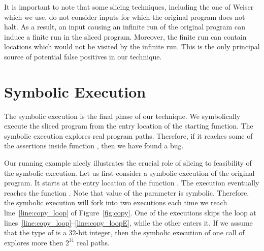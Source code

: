 It is important to note that some slicing techniques, including the one
of Weiser~\cite{slicing} which we use, do not consider inputs for which the
original program does not halt.  As a result, an input causing an infinite run
of the original program can induce a finite run in the sliced program.
Moreover, the finite run can contain locations which would not be visited by
the infinite run.  This is the only principal source of potential false
positives in our technique.


\section{Symbolic Execution} \label{sec:fmics_symexe}

The symbolic execution is the final phase of our technique. We symbolically
execute the sliced program from the entry location of the starting function.
The symbolic execution explores real program paths. Therefore, if it reaches
some of the assertions inside function , then we have found a
bug.

Our running example nicely illustrates the crucial role of slicing to
feasibility of the symbolic execution. Let us first consider a symbolic
execution of the original program. It starts at the entry location of the
function . The execution eventually reaches the function
. Note that value of the parameter  is symbolic. Therefore,
the symbolic execution will fork into two executions each time we reach
line~\ref{line:copy_loop} of Figure~\ref{fig:copy}. One of the executions
skips the loop at lines~\ref{line:copy_loop}--\ref{line:copy_loopE},
while the other enters it. If we assume that the type of  is a 32-bit
integer, then the symbolic execution of one call of  explores more
then $2^{31}$ real paths.


